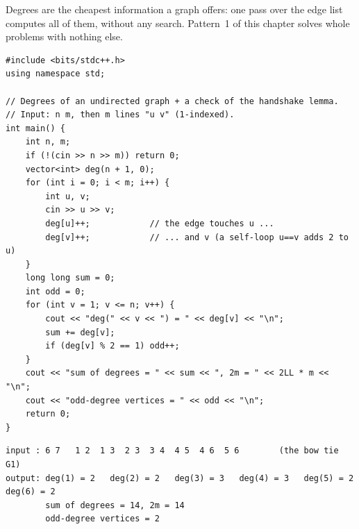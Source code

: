 \begin{diagrambox}
\end{diagrambox}

Degrees are the cheapest information a graph offers: one pass over the edge list computes all of them, without any search. Pattern~1 of this chapter solves whole problems with nothing else.

\begin{lstlisting}[style=cpp]
#include <bits/stdc++.h>
using namespace std;

// Degrees of an undirected graph + a check of the handshake lemma.
// Input: n m, then m lines "u v" (1-indexed).
int main() {
    int n, m;
    if (!(cin >> n >> m)) return 0;
    vector<int> deg(n + 1, 0);
    for (int i = 0; i < m; i++) {
        int u, v;
        cin >> u >> v;
        deg[u]++;            // the edge touches u ...
        deg[v]++;            // ... and v (a self-loop u==v adds 2 to u)
    }
    long long sum = 0;
    int odd = 0;
    for (int v = 1; v <= n; v++) {
        cout << "deg(" << v << ") = " << deg[v] << "\n";
        sum += deg[v];
        if (deg[v] % 2 == 1) odd++;
    }
    cout << "sum of degrees = " << sum << ", 2m = " << 2LL * m << "\n";
    cout << "odd-degree vertices = " << odd << "\n";
    return 0;
}
\end{lstlisting}

\begin{lstlisting}[style=trace]
input : 6 7   1 2  1 3  2 3  3 4  4 5  4 6  5 6        (the bow tie G1)
output: deg(1) = 2   deg(2) = 2   deg(3) = 3   deg(4) = 3   deg(5) = 2   deg(6) = 2
        sum of degrees = 14, 2m = 14
        odd-degree vertices = 2
\end{lstlisting}

